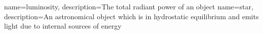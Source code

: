 %
%
%
%
%
%
%
{
    name=luminosity,
    description={The total radiant power of an object}
}
{
    name=star,
    description={An astronomical object which is in hydrostatic equilibrium and emits light due to internal sources of energy}
}
